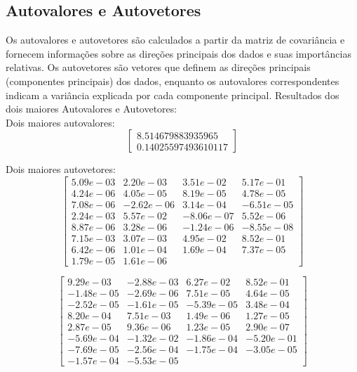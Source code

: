 \documentclass{article}
\begin{document}
\subsection{Autovalores e Autovetores}

Os autovalores e autovetores são calculados a partir da matriz de covariância e fornecem informações sobre as direções principais dos dados e suas importâncias relativas. Os autovetores são vetores que definem as direções principais (componentes principais) dos dados, enquanto os autovalores correspondentes indicam a variância explicada por cada componente principal.
Resultados dos dois maiores Autovalores e Autovetores:\\


Dois maiores autovalores:
\[
\begin{bmatrix}
8.514679883935965 \\
0.14025597493610117
\end{bmatrix}
\]

Dois maiores autovetores:
\[
\begin{bmatrix}
5.09e-03 & 2.20e-03 & 3.51e-02 & 5.17e-01 \\
4.24e-06 & 4.05e-05 & 8.19e-05 & 4.78e-05 \\
7.08e-06 & -2.62e-06 & 3.14e-04 & -6.51e-05 \\
2.24e-03 & 5.57e-02 & -8.06e-07 & 5.52e-06 \\
8.87e-06 & 3.28e-06 & -1.24e-06 & -8.55e-08 \\
7.15e-03 & 3.07e-03 & 4.95e-02 & 8.52e-01 \\
6.42e-06 & 1.01e-04 & 1.69e-04 & 7.37e-05 \\
1.79e-05 & 1.61e-06
\end{bmatrix}
\]

\[
\begin{bmatrix}
9.29e-03 & -2.88e-03 & 6.27e-02 & 8.52e-01 \\
-1.48e-05 & -2.69e-06 & 7.51e-05 & 4.64e-05 \\
-2.52e-05 & -1.61e-05 & -5.39e-05 & 3.48e-04 \\
8.20e-04 & 7.51e-03 & 1.49e-06 & 1.27e-05 \\
2.87e-05 & 9.36e-06 & 1.23e-05 & 2.90e-07 \\
-5.69e-04 & -1.32e-02 & -1.86e-04 & -5.20e-01 \\
-7.69e-05 & -2.56e-04 & -1.75e-04 & -3.05e-05 \\
-1.57e-04 & -5.53e-05
\end{bmatrix}
\]
\end{document}
